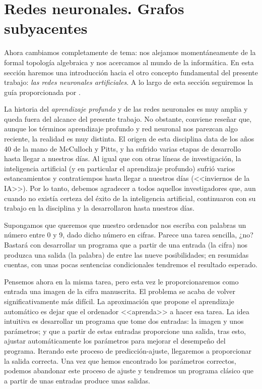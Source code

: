 \documentclass[12pt, a4paper, twoside]{book}
\numberwithin{equation}{section}
\theoremstyle{definition}
\theoremstyle{remark}
\theoremstyle{plain}
\begin{document}
	\section{Redes neuronales. Grafos subyacentes}
	
	Ahora cambiamos completamente de tema: nos alejamos momentáneamente de 
	la formal topología algebraica y nos acercamos al mundo 
	de la informática. En esta sección haremos una
	introducción hacia el otro concepto fundamental del presente trabajo: 
	\emph{las redes neuronales artificiales}. A lo largo de esta sección
	seguiremos la guía proporcionada por \cite{Goodfellow-et-al-2016,
	IA-Jonathan,MDiscreta-Guti}.

	La historia del \emph{aprendizaje profundo} y de las redes neuronales 
	es muy amplia y queda fuera del alcance del presente trabajo. No 
	obstante, conviene reseñar que, aunque los términos aprendizaje 
	profundo y red neuronal nos parezcan algo reciente, la realidad es muy
	distinta. El origen de esta disciplina data de los años 40 de la mano
	de McCulloch y Pitts, y ha sufrido varias etapas de desarrollo hasta 
	llegar a nuestros días. Al igual que con otras líneas de 
	investigación, la inteligencia artificial (y en particular el 
	aprendizaje profundo) sufrió varios estancamientos y contratiempos 
	hasta llegar a nuestros días (<<inviernos de la IA>>). Por lo tanto, 
	debemos agradecer a todos aquellos investigadores que, aun cuando no 
	existía certeza del éxito de la inteligencia artificial, continuaron 
	con su trabajo en la disciplina y la desarrollaron hasta nuestros 
	días.

	Supongamos que queremos que nuestro ordenador nos escriba con palabras
	un número entre 0 y 9, dado dicho número en cifras. Parece una tarea 
	sencilla, ¿no?
	Bastará con desarrollar un programa que a partir de una entrada (la 
	cifra) nos produzca una salida (la palabra) de entre las nueve 
	posibilidades; en resumidas cuentas, con unas pocas sentencias 
	condicionales tendremos el resultado esperado.  

	Pensemos ahora en la 
	misma tarea, pero esta vez le proporcionaremos como entrada una imagen
	de la cifra manuscrita. El problema se acaba de volver 
	significativamente más difícil. La aproximación que propone el 
	aprendizaje automático es dejar que el ordenador <<aprenda>> a hacer 
	esa tarea. La idea intuitiva es desarrollar un programa que tome dos 
	entradas: la imagen y unos parámetros; y que a partir de estas 
	entradas proporcione una salida, tras esto, ajustar automáticamente 
	los parámetros para mejorar el desempeño del programa. Iterando este 
	proceso de predicción-ajuste, llegaremos a proporcionar la salida 
	correcta. Una vez que hemos encontrado los parámetros correctos,
	podemos abandonar este proceso de ajuste y tendremos un 
	programa clásico que a partir de unas entradas produce unas salidas.
\end{document}
